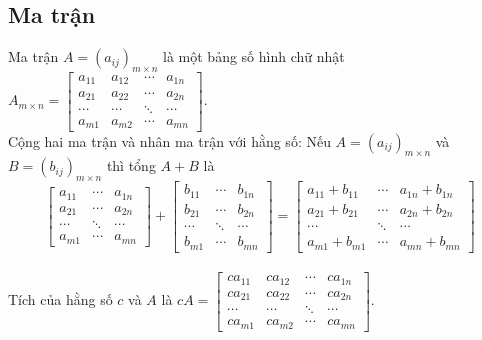 \documentclass[12pt,a4paper]{report}
\begin{document}
	\subsection{Ma trận}
	Ma trận $A = (a_{ij})_{m \times n}$ là một bảng số hình chữ nhật $A_{m \times n} = \begin{bmatrix}
		a_{11}&a_{12}&\cdots&a_{1n}\\
		a_{21}&a_{22}&\cdots&a_{2n}\\
		\cdots&\cdots&\ddots&\cdots\\
		a_{m1}&a_{m2}&\cdots&a_{mn}
	\end{bmatrix}$.\\ Cộng hai ma trận và nhân ma trận với hằng số: Nếu $A = (a_{ij})_{m \times n}$ và $B = (b_{ij})_{m \times n}$ thì tổng $A + B$ là 
	$$\begin{bmatrix}
		a_{11}&\cdots&a_{1n}\\
		a_{21}&\cdots&a_{2n}\\
		\cdots&\ddots&\cdots\\
		a_{m1}&\cdots&a_{mn}
	\end{bmatrix} + \begin{bmatrix}
		b_{11}&\cdots&b_{1n}\\
		b_{21}&\cdots&b_{2n}\\
		\cdots&\ddots&\cdots\\
		b_{m1}&\cdots&b_{mn}\end{bmatrix} = \begin{bmatrix}
		a_{11} + b_{11}&\cdots&a_{1n} + b_{1n}\\
		a_{21} + b_{21}&\cdots&a_{2n} + b_{2n}\\
		\cdots&\ddots&\cdots\\
		a_{m1} + b_{m1}&\cdots&a_{mn} + b_{mn}
	\end{bmatrix}$$ \\Tích của hằng số  $c$ và $A$ là $cA = \begin{bmatrix}
		ca_{11}&ca_{12}&\cdots&ca_{1n}\\
		ca_{21}&ca_{22}&\cdots&ca_{2n}\\
		\cdots&\cdots&\ddots&\cdots\\
		ca_{m1}&ca_{m2}&\cdots&ca_{mn}
	\end{bmatrix} $.
	
\end{document}
